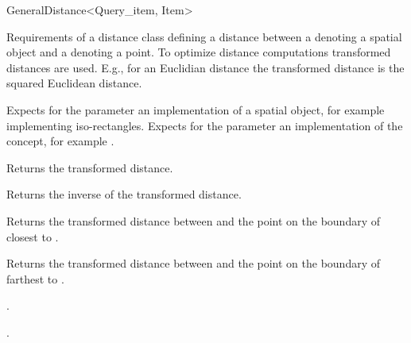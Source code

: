 

\begin{ccRefConcept}{GeneralDistance<Query_item, Item>}


\ccDefinition

Requirements of a distance class defining a distance between a 
denoting a spatial object and a  denoting a point.
To optimize distance computations transformed distances are used.
E.g., for an Euclidian distance the transformed distance is the squared Euclidean distance.

\ccParameters

Expects for the parameter  an implementation of a spatial object, for
example  implementing iso-rectangles.
Expects for the parameter  an implementation of the
 concept, for example .

\ccTypes


\ccCreation
{}  %



 {Returns the transformed distance.}

 {Returns the inverse of the transformed distance.}


{Returns the transformed distance between  and
the point on the boundary of  closest to .}

{Returns the transformed distance between  and
the point on the boundary of  farthest to .}

\ccHasModels

.

\ccSeeAlso

.

\end{ccRefConcept}


